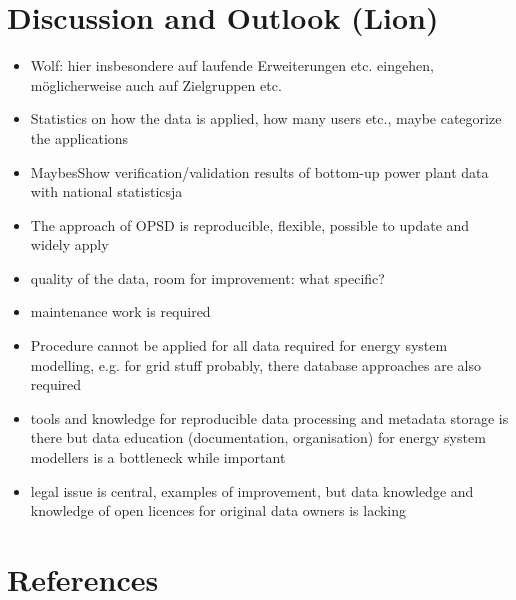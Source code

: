 \documentclass[article]{elsarticle}
\begin{document}
\section{Discussion and Outlook (Lion)}
\label{sec:discussion}
\begin{itemize}
    \item Wolf: hier insbesondere auf laufende Erweiterungen etc. eingehen, möglicherweise auch auf Zielgruppen etc. 
    \item Statistics on how the data is applied, how many users etc., maybe categorize the applications
    \item MaybesShow verification/validation results of bottom-up power plant data with national statisticsja
    \item The approach of OPSD is reproducible, flexible, possible to update and widely apply
    \item quality of the data, room for improvement: what specific?
    \item maintenance work is required
    \item Procedure cannot be applied for all data required for energy system modelling, e.g. for grid stuff probably, there database approaches are also required
    \item tools and knowledge for reproducible data processing and metadata storage is there but data education (documentation, organisation) for energy system modellers is a bottleneck while important
    \item legal issue is central, examples of improvement, but data knowledge and knowledge of open licences for original data owners is lacking
\end{itemize}

\section*{References}


\end{document}
